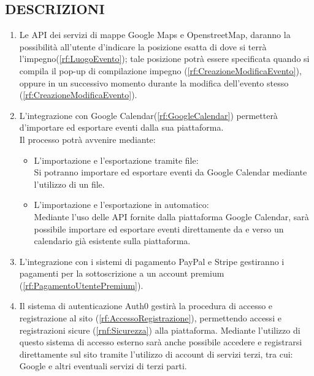 \subsection*{DESCRIZIONI}
\begin{enumerate}
    \item Le API dei servizi di mappe Google Maps e OpenstreetMap, daranno la possibilità all'utente d'indicare la posizione esatta di dove si terrà l'impegno(\ref{rf:LuogoEvento}); tale posizione potrà essere specificata quando si compila il pop-up di compilazione impegno (\ref{rf:CreazioneModificaEvento}), oppure in un successivo momento durante la modifica dell'evento stesso (\ref{rf:CreazioneModificaEvento}).

    \item L'integrazione con Google Calendar(\ref{rf:GoogleCalendar}) permetterà d'importare ed esportare eventi dalla sua piattaforma.\\
          Il processo potrà avvenire mediante:
          \begin{itemize}
              \item L'importazione e l'esportazione tramite file: \\
                    Si potranno importare ed esportare eventi da Google Calendar mediante l'utilizzo di un file.
              \item L'importazione e l'esportazione in automatico: \\
                    Mediante l'uso delle API fornite dalla piattaforma Google Calendar, sarà possibile importare ed esportare eventi direttamente da e verso un calendario già esistente sulla piattaforma.
          \end{itemize}

    \item L'integrazione con i sistemi di pagamento PayPal e Stripe gestiranno i pagamenti per la sottoscrizione a un account premium (\ref{rf:PagamentoUtentePremium}).

    \item Il sistema di autenticazione Auth0 gestirà la procedura di accesso e registrazione al sito (\ref{rf:AccessoRegistrazione}), permettendo accessi e registrazioni sicure (\ref{rnf:Sicurezza}) alla piattaforma. Mediante l'utilizzo di questo sistema di accesso esterno sarà anche possibile accedere e registrarsi direttamente sul sito tramite l'utilizzo di account di servizi terzi, tra cui: Google e altri eventuali servizi di terzi parti.


\end{enumerate}
